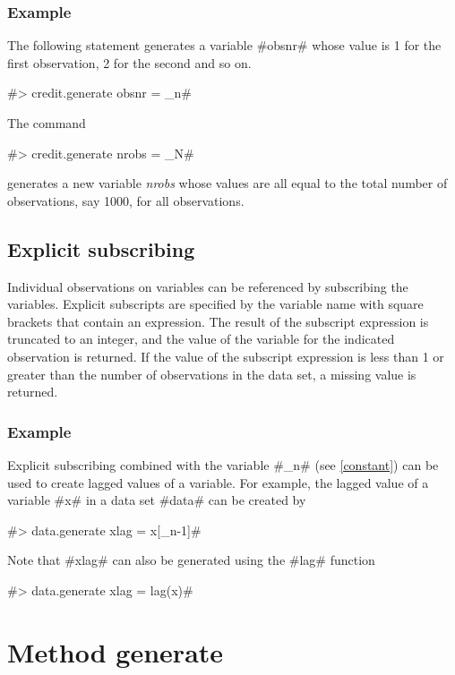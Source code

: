 \subsubsection*{Example}

The following statement generates a variable #obsnr# whose value
is 1 for the first observation, 2 for the second and so on.

#> credit.generate obsnr = _n#

The command

#> credit.generate nrobs = _N#

generates a new variable {\em nrobs} whose values are all equal to
the total number of observations, say 1000, for all observations.

\subsection{Explicit subscribing}
 

Individual observations on variables can be referenced by
subscribing the variables. Explicit subscripts are specified by
the variable name with square brackets that contain an expression.
The result of the subscript expression is truncated to an integer,
and the value of the variable for the indicated observation is
returned. If  the value of the subscript expression is less than 1
or greater than the number of observations in the data set,
a missing value is returned.

\subsubsection*{Example}

Explicit subscribing combined with the variable #_n# (see
\autoref{constant}) can be used to create lagged values of a
variable. For example, the lagged value of a variable #x# in a
data set #data# can be created by

#> data.generate xlag = x[_n-1]#

Note that #xlag# can also be generated using the #lag# function

#> data.generate xlag = lag(x)#


\clearpage

\section{Method generate}
\label{generate} 

